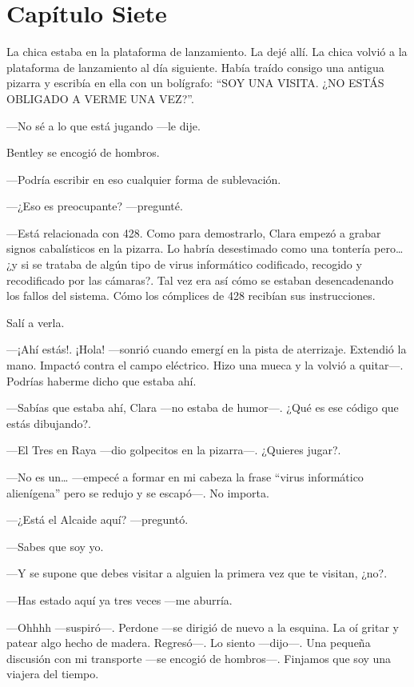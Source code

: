 \chapter*{Capítulo Siete}

La chica estaba en la plataforma de lanzamiento. La dejé allí. La chica
volvió a la plataforma de lanzamiento al día siguiente. Había traído
consigo una antigua pizarra y escribía en ella con un bolígrafo: ``SOY
UNA VISITA. ¿NO ESTÁS OBLIGADO A VERME UNA VEZ?''.

---No sé a lo que está jugando ---le dije.

Bentley se encogió de hombros.

---Podría escribir en eso cualquier forma de sublevación.

---¿Eso es preocupante? ---pregunté.

---Está relacionada con 428. Como para demostrarlo, Clara empezó a
grabar signos cabalísticos en la pizarra. Lo habría desestimado como una
tontería pero\ldots{} ¿y si se trataba de algún tipo de virus
informático codificado, recogido y recodificado por las cámaras?. Tal
vez era así cómo se estaban desencadenando los fallos del sistema. Cómo
los cómplices de 428 recibían sus instrucciones.

Salí a verla.

---¡Ahí estás!. ¡Hola! ---sonrió cuando emergí en la pista de
aterrizaje. Extendió la mano. Impactó contra el campo eléctrico. Hizo
una mueca y la volvió a quitar---. Podrías haberme dicho que estaba ahí.

---Sabías que estaba ahí, Clara ---no estaba de humor---. ¿Qué es ese
código que estás dibujando?.

---El Tres en Raya ---dio golpecitos en la pizarra---. ¿Quieres jugar?.

---No es un\ldots{} ---empecé a formar en mi cabeza la frase ``virus
informático alienígena'' pero se redujo y se escapó---. No importa.

---¿Está el Alcaide aquí? ---preguntó.

---Sabes que soy yo.

---Y se supone que debes visitar a alguien la primera vez que te
visitan, ¿no?.

---Has estado aquí ya tres veces ---me aburría.

---Ohhhh ---suspiró---. Perdone ---se dirigió de nuevo a la esquina. La
oí gritar y patear algo hecho de madera. Regresó---. Lo siento
---dijo---. Una pequeña discusión con mi transporte ---se encogió de
hombros---. Finjamos que soy una viajera del tiempo.

